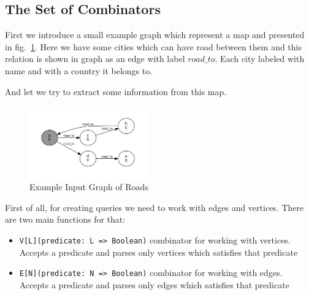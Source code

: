 \subsection{The Set of Combinators}

First we introduce a small example graph which represent a map and presented in fig.~\ref{fig:graph}.
Here we have some cities which can have road between them and this relation is shown in graph as an edge with label $road\_to$.
Each city labeled with name and with a country it belongs to.

And let we try to extract some information from this map.

\begin{figure}[h]
\includegraphics[width=0.45\textwidth]{graph}
\caption{Example Input Graph of Roads}
\label{fig:graph}
\end{figure}

First of all, for creating queries we need to work with edges and vertices.
There are two main functions for that:
\begin{itemize}
    \item \lstinline{V[L](predicate: L => Boolean)} combinator for working with vertices. Accepts a predicate and parses only vertices which satisfies that predicate
    \item \lstinline{E[N](predicate: N => Boolean)} combinator for working with edges. Accepts a predicate and parses only edges which satisfies that predicate  
\end{itemize}


